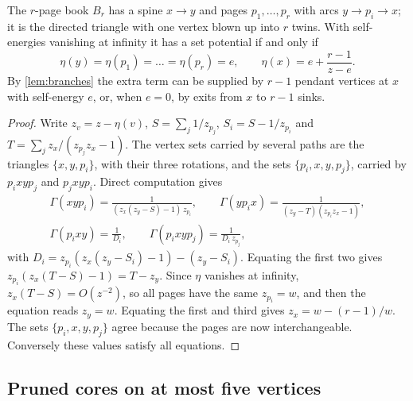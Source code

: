 \documentclass[final]{siamart0516}
\numberwithin{theorem}{section}
\numberwithin{equation}{section}
\theoremstyle{siamnonum}
\theoremstyle{plain}
\begin{document}
\begin{theorem}[books]\label{thm:books}
The $r$-page book $B_r$ has a spine $x\to y$ and pages $p_1,\dots,p_r$ with arcs $y\to p_i\to x$; it is the directed triangle with one vertex blown up into $r$ twins. With self-energies vanishing at infinity it has a set potential if and only if
\[
\eta(y)=\eta(p_1)=\dots=\eta(p_r)=e,\qquad \eta(x)=e+\frac{r-1}{z-e}.
\]
By \cref{lem:branches} the extra term can be supplied by $r-1$ pendant vertices at $x$ with self-energy $e$, or, when $e=0$, by exits from $x$ to $r-1$ sinks.
\end{theorem}
\begin{proof}
Write $z_v=z-\eta(v)$, $S=\sum_j1/z_{p_j}$, $S_i=S-1/z_{p_i}$ and $T=\sum_jz_x/(z_{p_j}z_x-1)$. The vertex sets carried by several paths are the triangles $\{x,y,p_i\}$, with their three rotations, and the sets $\{p_i,x,y,p_j\}$, carried by $p_ixyp_j$ and $p_jxyp_i$. Direct computation gives
\begin{gather*}
\Gamma(xyp_i)=\frac{1}{(z_x(z_y-S)-1)\,z_{p_i}},\qquad \Gamma(yp_ix)=\frac{1}{(z_y-T)(z_{p_i}z_x-1)},\\
\Gamma(p_ixy)=\frac{1}{D_i},\qquad \Gamma(p_ixyp_j)=\frac{1}{D_i\,z_{p_j}},
\end{gather*}
with $D_i=z_{p_i}(z_x(z_y-S_i)-1)-(z_y-S_i)$. Equating the first two gives $z_{p_i}(z_x(T-S)-1)=T-z_y$. Since $\eta$ vanishes at infinity, $z_x(T-S)=O(z^{-2})$, so all pages have the same $z_{p_i}=w$, and then the equation reads $z_y=w$. Equating the first and third gives $z_x=w-(r-1)/w$. The sets $\{p_i,x,y,p_j\}$ agree because the pages are now interchangeable. Conversely these values satisfy all equations.
\end{proof}

\subsection{Pruned cores on at most five vertices}
\end{document}
